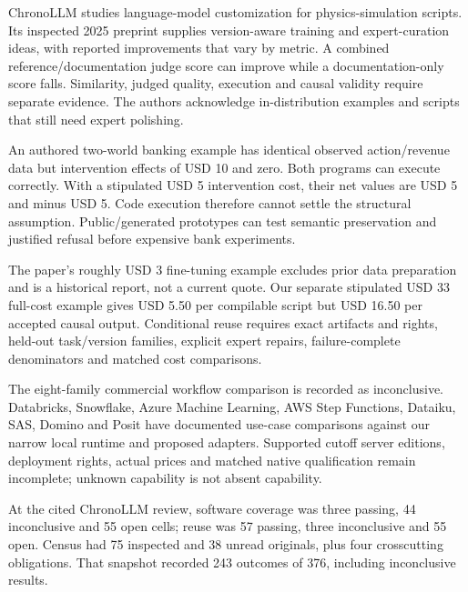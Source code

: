 ChronoLLM studies language-model customization for physics-simulation
scripts. Its inspected 2025 preprint supplies version-aware training and
expert-curation ideas, with reported improvements that vary by metric. A
combined reference/documentation judge score can improve while a
documentation-only score falls. Similarity, judged quality, execution
and causal validity require separate evidence. The authors acknowledge
in-distribution examples and scripts that still need expert polishing.
\citep{exec24_chronollm_original,exec24_chronollm_reference}

An authored two-world banking example has identical observed
action/revenue data but intervention effects of USD 10 and zero. Both
programs can execute correctly. With a stipulated USD 5 intervention
cost, their net values are USD 5 and minus USD 5. Code execution
therefore cannot settle the structural assumption. Public/generated
prototypes can test semantic preservation and justified refusal before
expensive bank experiments. \citep{exec24_chronollm_reference}

The paper's roughly USD 3 fine-tuning example excludes prior data
preparation and is a historical report, not a current quote. Our
separate stipulated USD 33 full-cost example gives USD 5.50 per
compilable script but USD 16.50 per accepted causal output. Conditional
reuse requires exact artifacts and rights, held-out task/version
families, explicit expert repairs, failure-complete denominators and
matched cost comparisons.
\citep{exec24_chronollm_original,exec24_chronollm_reference}

The eight-family commercial workflow comparison is recorded as
inconclusive. Databricks, Snowflake, Azure Machine Learning, AWS Step
Functions, Dataiku, SAS, Domino and Posit have documented use-case
comparisons against our narrow local runtime and proposed adapters.
Supported cutoff server editions, deployment rights, actual prices and
matched native qualification remain incomplete; unknown capability is
not absent capability. \citep{sp24chronollm_commercial}

At the cited ChronoLLM review, software coverage was three passing, 44
inconclusive and 55 open cells; reuse was 57 passing, three inconclusive
and 55 open. Census had 75 inspected and 38 unread originals, plus four
crosscutting obligations. That snapshot recorded 243 outcomes of 376,
including inconclusive results.
\citep{sp24chronollm_reader,sp24chronollm_progress}

